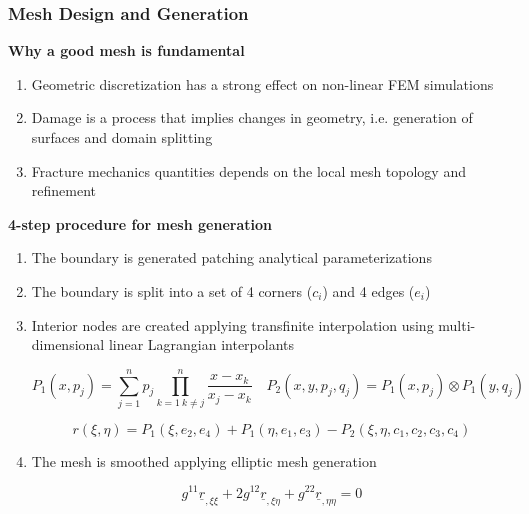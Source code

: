 \documentclass[first,firstsupp,lastsupp,handout,last,hyperref,table]{ETHclass}
\begin{document}
\begin{frame}
\frametitle{\vspace*{0.25cm}\small Mesh Design and Generation}
\vspace{-0.5cm}
\centering
\tiny
\begin{alertblock}{\scriptsize \bf{Why a good mesh is fundamental}}
\begin{enumerate}
\item Geometric discretization has a strong effect on non-linear FEM simulations 
\item Damage is a process that implies changes in geometry, i.e. generation of surfaces and domain splitting
\item Fracture mechanics quantities depends on the local mesh topology and refinement 
\end{enumerate}
\end{alertblock}
\begin{alertblock}{\scriptsize \bf{4-step procedure for mesh generation}}
\begin{enumerate}
\item The boundary is generated patching analytical parameterizations
\item The boundary is split into a set of 4 corners ($c_{i}$) and 4 edges ($e_{i}$)
\item Interior nodes are created applying transfinite interpolation using multi-dimensional linear Lagrangian interpolants

\begin{equation*}
P_{1}(x,p_{j})=\sum_{j=1}^{n}p_{j}\prod_{k=1\ k\neq j}^{n}\frac{x-x_{k}}{x_{j}-x_{k}}\quad P_{2}(x,y,p_{j},q_{j})=P_{1}(x,p_{j})\otimes P_{1}(y,q_{j})
\end{equation*}

\begin{equation*}
r(\xi,\eta)=P_{1}(\xi,e_{2},e_{4})+P_{1}(\eta,e_{1},e_{3})- P_{2}(\xi,\eta,c_{1},c_{2},c_{3},c_{4})
\end{equation*}

\item The mesh is smoothed applying elliptic mesh generation

\begin{equation*}
g^{11}\underline{r}_{,\xi\xi}+2g^{12}\underline{r}_{,\xi\eta}+g^{22}\underline{r}_{,\eta\eta}=0
\end{equation*}

\end{enumerate}
\end{alertblock}
\end{frame}
\end{document}
